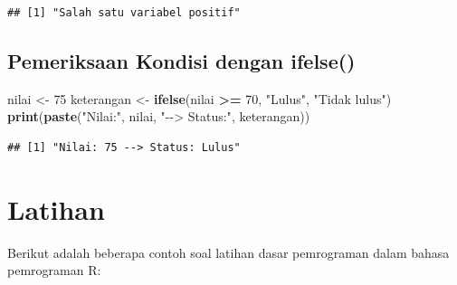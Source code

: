 \documentclass[
]{book}
\newenvironment{Shaded}{\begin{snugshade}}{\end{snugshade}}
\newcommand{\DecValTok}[1]{\textcolor[rgb]{0.00,0.00,0.81}{#1}}
\newcommand{\FunctionTok}[1]{\textcolor[rgb]{0.13,0.29,0.53}{\textbf{#1}}}
\newcommand{\NormalTok}[1]{#1}
\newcommand{\OtherTok}[1]{\textcolor[rgb]{0.56,0.35,0.01}{#1}}
\newcommand{\SpecialCharTok}[1]{\textcolor[rgb]{0.81,0.36,0.00}{\textbf{#1}}}
\newcommand{\StringTok}[1]{\textcolor[rgb]{0.31,0.60,0.02}{#1}}
\begin{document}
\begin{verbatim}
## [1] "Salah satu variabel positif"
\end{verbatim}

\hypertarget{pemeriksaan-kondisi-dengan-ifelse}{%
\subsection{Pemeriksaan Kondisi dengan ifelse()}\label{pemeriksaan-kondisi-dengan-ifelse}}

\begin{Shaded}
\begin{Highlighting}[]
\NormalTok{nilai }\OtherTok{\textless{}{-}} \DecValTok{75}
\NormalTok{keterangan }\OtherTok{\textless{}{-}} \FunctionTok{ifelse}\NormalTok{(nilai }\SpecialCharTok{\textgreater{}=} \DecValTok{70}\NormalTok{, }\StringTok{"Lulus"}\NormalTok{, }\StringTok{"Tidak lulus"}\NormalTok{)}
\FunctionTok{print}\NormalTok{(}\FunctionTok{paste}\NormalTok{(}\StringTok{"Nilai:"}\NormalTok{, nilai, }\StringTok{"{-}{-}\textgreater{} Status:"}\NormalTok{, keterangan))}
\end{Highlighting}
\end{Shaded}

\begin{verbatim}
## [1] "Nilai: 75 --> Status: Lulus"
\end{verbatim}

\hypertarget{latihan}{%
\section{Latihan}\label{latihan}}

Berikut adalah beberapa contoh soal latihan dasar pemrograman dalam bahasa pemrograman R:
\end{document}
